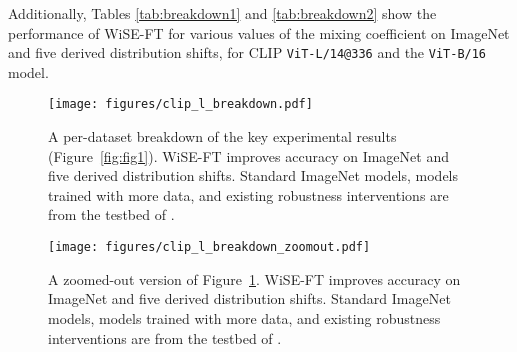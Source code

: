 Additionally, Tables \ref{tab:breakdown1} and \ref{tab:breakdown2} show the performance of WiSE-FT for various values of the mixing coefficient  on ImageNet and five derived distribution shifts, for CLIP \texttt{ViT-L/14@336} and the \texttt{ViT-B/16} model.

\FloatBarrier



\begin{figure}[h]
    \centering
    \texttt{[image: figures/clip\_l\_breakdown.pdf]}
    \caption{A per-dataset breakdown of the key experimental results (Figure~\ref{fig:fig1}). WiSE-FT improves accuracy on ImageNet and five derived distribution shifts.  Standard ImageNet models, models trained with more data, and existing robustness interventions are from the testbed of \citet{taori2020measuring}.}
    \label{fig:main_breakdown}
\end{figure}

\begin{figure}[h]
    \centering
    \texttt{[image: figures/clip\_l\_breakdown\_zoomout.pdf]}
    \caption{A zoomed-out version of Figure~\ref{fig:main_breakdown}. WiSE-FT improves accuracy on ImageNet and five derived distribution shifts.  Standard ImageNet models, models trained with more data, and existing robustness interventions are from the testbed of \citet{taori2020measuring}.}
    \label{fig:main_zoomout}
\end{figure}
\FloatBarrier

